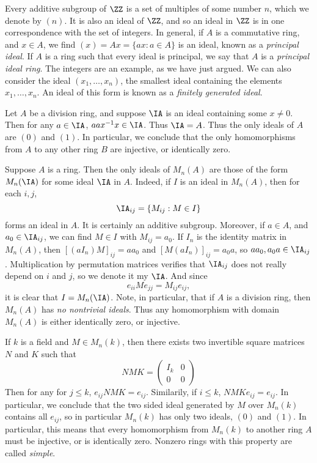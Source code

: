 \begin{example}
    Every additive subgroup of $\ZZ$ is a set of multiples of some number $n$, which we denote by $(n)$. It is also an ideal of $\ZZ$, and so an ideal in $\ZZ$ is in one correspondence with the set of integers. In general, if $A$ is a commutative ring, and $x \in A$, we find $(x) = Ax = \{ ax: a \in A \}$ is an ideal, known as a \emph{principal ideal}. If $A$ is a ring such that every ideal is principal, we say that $A$ is a \emph{principal ideal ring}. The integers are an example, as we have just argued. We can also consider the ideal $(x_1, \dots, x_n)$, the smallest ideal containing the elements $x_1, \dots, x_n$. An ideal of this form is known as a \emph{finitely generated ideal}.
\end{example}

\begin{example}
    Let $A$ be a division ring, and suppose $\IA$ is an ideal containing some $x \neq 0$. Then for any $a \in \IA$, $a ax^{-1}x \in \IA$. Thus $\IA = A$. Thus the only ideals of $A$ are $(0)$ and $(1)$. In particular, we conclude that the only homomorphisms from $A$ to any other ring $B$ are injective, or identically zero.
\end{example}

\begin{example}
    Suppose $A$ is a ring. Then the only ideals of $M_n(A)$ are those of the form $M_n(\IA)$ for some ideal $\IA$ in $A$. Indeed, if $I$ is an ideal in $M_n(A)$, then for each $i,j$,
    \[ \IA_{ij} = \{ M_{ij} : M \in I \} \]
    forms an ideal in $A$. It is certainly an additive subgroup. Moreover, if $a \in A$, and $a_0 \in \IA_{ij}$, we can find $M \in I$ with $M_{ij} = a_0$. If $I_n$ is the identity matrix in $M_n(A)$, then $[(aI_n)M]_{ij} = aa_0$ and $[M(aI_n)]_{ij} = a_0a$, so $aa_0, a_0a \in \IA_{ij}$. Multiplication by permutation matrices verifies that $\IA_{ij}$ does not really depend on $i$ and $j$, so we denote it my $\IA$. And since
    \[ e_{ii}Me_{jj} = M_{ij} e_{ij}, \]
    it is clear that $I = M_n(\IA)$. Note, in particular, that if $A$ is a division ring, then $M_n(A)$ has \emph{no nontrivial ideals}. Thus any homomorphism with domain $M_n(A)$ is either identically zero, or injective.
\end{example}

\begin{example}
    If $k$ is a field and $M \in M_n(k)$, then there exists two invertible square matrices $N$ and $K$ such that
    \[  NMK = \begin{pmatrix} I_k & 0 \\ 0 & 0 \end{pmatrix} \]
    Then for any for $j \leq k$, $e_{ij} NMK = e_{ij}$. Similarily, if $i \leq k$, $NMKe_{ij} = e_{ij}$. In particular, we conclude that the two sided ideal generated by $M$ over $M_n(k)$ contains all $e_{ij}$, so in particular $M_n(k)$ has only two ideals, $(0)$ and $(1)$. In particular, this means that every homomorphism from $M_n(k)$ to another ring $A$ must be injective, or is identically zero. Nonzero rings with this property are called \emph{simple}.
\end{example}


